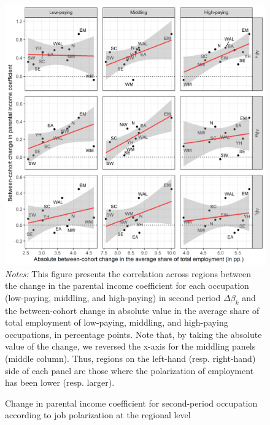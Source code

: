 \begin{figure}[!tb]
    \centering
    \caption{Change in parental income coefficient for second-period occupation according to job polarization at the regional level}
    \label{chap2-fig:regocc-absolute-all}
    \includegraphics[width=\linewidth]{chap2/graphic/regocc-absolute-all.png}
    \vspace{-3em}
	\justify\singlespacing\footnotesize{\textit{Notes:} This figure presents the correlation across regions between the change in the parental income coefficient for each occupation (low-paying, middling, and high-paying) in second period $\Delta\beta_k$ and the between-cohort change in absolute value in the average share of total employment of low-paying, middling, and high-paying occupations, in percentage points. Note that, by taking the absolute value of the change, we reversed the x-axis for the middling panels (middle column). Thus, regions on the left-hand (resp. right-hand) side of each panel are those where the polarization of employment has been lower (resp. larger).}
\end{figure}